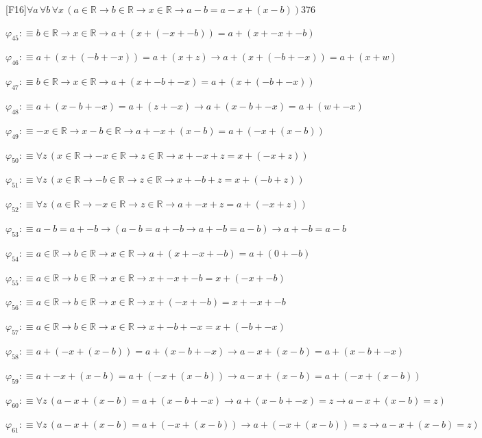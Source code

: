 \begin{fullproof}{[F16]}{$\forall a\,\forall b\,\forall x\,(a \in \mathbb{R} \to b \in \mathbb{R} \to x \in \mathbb{R} \to a - b = a - x + (x - b))$}{376}
\begin{abbrevlist}
\item $\varphi_{45} :\equiv b \in \mathbb{R} \to x \in \mathbb{R} \to a + (x + (-x + -b)) = a + (x + -x + -b)$
\item $\varphi_{46} :\equiv a + (x + (-b + -x)) = a + (x + z) \to a + (x + (-b + -x)) = a + (x + w)$
\item $\varphi_{47} :\equiv b \in \mathbb{R} \to x \in \mathbb{R} \to a + (x + -b + -x) = a + (x + (-b + -x))$
\item $\varphi_{48} :\equiv a + (x - b + -x) = a + (z + -x) \to a + (x - b + -x) = a + (w + -x)$
\item $\varphi_{49} :\equiv -x \in \mathbb{R} \to x - b \in \mathbb{R} \to a + -x + (x - b) = a + (-x + (x - b))$
\item $\varphi_{50} :\equiv \forall z\,(x \in \mathbb{R} \to -x \in \mathbb{R} \to z \in \mathbb{R} \to x + -x + z = x + (-x + z))$
\item $\varphi_{51} :\equiv \forall z\,(x \in \mathbb{R} \to -b \in \mathbb{R} \to z \in \mathbb{R} \to x + -b + z = x + (-b + z))$
\item $\varphi_{52} :\equiv \forall z\,(a \in \mathbb{R} \to -x \in \mathbb{R} \to z \in \mathbb{R} \to a + -x + z = a + (-x + z))$
\item $\varphi_{53} :\equiv a - b = a + -b \to (a - b = a + -b \to a + -b = a - b) \to a + -b = a - b$
\item $\varphi_{54} :\equiv a \in \mathbb{R} \to b \in \mathbb{R} \to x \in \mathbb{R} \to a + (x + -x + -b) = a + (0 + -b)$
\item $\varphi_{55} :\equiv a \in \mathbb{R} \to b \in \mathbb{R} \to x \in \mathbb{R} \to x + -x + -b = x + (-x + -b)$
\item $\varphi_{56} :\equiv a \in \mathbb{R} \to b \in \mathbb{R} \to x \in \mathbb{R} \to x + (-x + -b) = x + -x + -b$
\item $\varphi_{57} :\equiv a \in \mathbb{R} \to b \in \mathbb{R} \to x \in \mathbb{R} \to x + -b + -x = x + (-b + -x)$
\item $\varphi_{58} :\equiv a + (-x + (x - b)) = a + (x - b + -x) \to a - x + (x - b) = a + (x - b + -x)$
\item $\varphi_{59} :\equiv a + -x + (x - b) = a + (-x + (x - b)) \to a - x + (x - b) = a + (-x + (x - b))$
\item $\varphi_{60} :\equiv \forall z\,(a - x + (x - b) = a + (x - b + -x) \to a + (x - b + -x) = z \to a - x + (x - b) = z)$
\item $\varphi_{61} :\equiv \forall z\,(a - x + (x - b) = a + (-x + (x - b)) \to a + (-x + (x - b)) = z \to a - x + (x - b) = z)$

\end{abbrevlist}
\end{fullproof}
